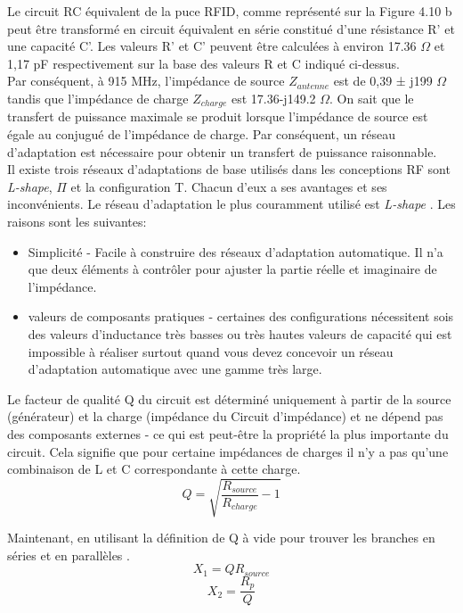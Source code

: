 \documentclass[11pt, a4paper, twoside]{book}
\begin{document}
Le circuit RC équivalent de la puce RFID, comme représenté sur la Figure 4.10 b peut être transformé en circuit équivalent en série constitué d'une résistance  R' et une capacité C'. Les valeurs R' et C'  peuvent être calculées à environ 17.36 \(\Omega\) et 1,17 pF respectivement sur la base des valeurs R et C indiqué ci-dessus.\\


Par conséquent, à 915 MHz, l'impédance de source \(Z_{antenne} \) est de 0,39 ± j199 \(\Omega\) tandis que l'impédance de charge \(Z_{charge} \) est 17.36-j149.2 \(\Omega\). On sait que le transfert de puissance maximale se produit lorsque l'impédance de source est égale au conjugué de l'impédance de charge. Par conséquent, un réseau d'adaptation est nécessaire pour obtenir un transfert de puissance raisonnable.\\

Il existe trois réseaux d'adaptations de base utilisés dans les conceptions RF sont \emph{L-shape}, \(\Pi\) et la configuration T. Chacun d'eux a ses avantages et ses inconvénients. Le réseau d'adaptation le plus couramment utilisé est \emph{L-shape} . Les raisons sont les suivantes:
\begin{itemize}
\item Simplicité - Facile à construire des réseaux d'adaptation automatique. Il n'a que deux éléments à contrôler pour ajuster la partie réelle et imaginaire de l'impédance.
\item valeurs de composants pratiques - certaines des configurations nécessitent sois des valeurs d'inductance très basses ou très hautes valeurs de capacité qui est impossible à réaliser surtout quand vous devez concevoir un réseau d'adaptation automatique avec une gamme très large.\\
\end{itemize}

Le facteur de qualité Q du circuit est déterminé uniquement à partir de la source (générateur) et la charge (impédance du Circuit d'impédance) et ne dépend pas des composants externes - ce qui est peut-être la propriété la plus importante du circuit. Cela signifie que pour certaine impédances de charges il n'y a pas qu'une combinaison de L et C correspondante à cette charge.
\begin{equation}
Q = \sqrt{\dfrac{R_{source}}{R_{charge}}-1}
\end{equation}

Maintenant, en utilisant la définition de Q à vide pour trouver les branches en séries et en parallèles .
\begin{equation}
X_{1}=QR_{source}
\end{equation}
\begin{equation}
X_{2}=\dfrac{R_{p}}{Q}
\end{equation}
\end{document}
